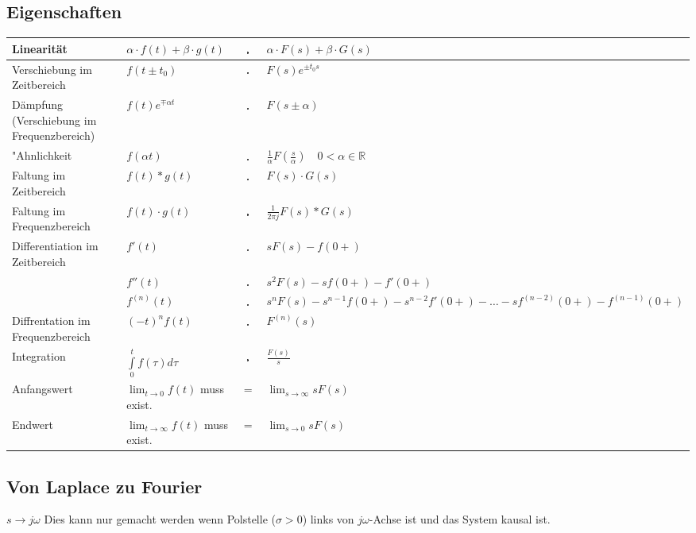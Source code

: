  	\subsection{Eigenschaften}
 	    \label{sec:Laplace Umwandulungen}
  		\renewcommand{\arraystretch}{2}
		\begin{tabular}{|l|l c p{5.5cm}|}
        	\hline
        	Linearität & 
 			$\alpha\cdot f(t) + \beta\cdot g(t)$ & $\FT$ & $\alpha\cdot F(s) +
 			\beta\cdot G(s)$ \\
 			\hline
 			Verschiebung im Zeitbereich &
 			$f(t\pm t_0) $ & $\FT$ & $ F(s)e^{\pm t_0 s}$ \\
 			\hline
 			Dämpfung (Verschiebung im Frequenzbereich) &
 			$f(t)e^{\mp\alpha t}$ & $\FT$ & $F(s\pm\alpha)$ \\
 			\hline
 			"Ahnlichkeit&
 			$f(\alpha t)$ & $\FT$ & $\frac{1}{\alpha}F \left (\frac{s}{\alpha} \right )
 			\quad 0 <\alpha \in\mathbb{R}$ \\
 			\hline
 			Faltung im Zeitbereich &
 			$f(t) \ast g(t)$ & $\FT$ &
 			$F(s) \cdot G(s)$\\
 			\hline 			
 			Faltung im Frequenzbereich &
 			$f(t) \cdot g(t)$ & $\FT$ & $\frac{1}{2 \pi j} F(s) \ast G(s)$ \\
 			\hline
 			Differentiation im Zeitbereich &
 			$f'(t)$ & $\FT$ & $sF(s) - f(0+)$ \\ 
 			&
 			$f''(t)$ & $\FT$ & $s^2 F(s) - sf(0+) - f'(0+)$\\ 
 			&
 			$f^{(n)}(t)$ & $\FT$ & $s^nF(s) - s^{n-1}f(0+) - s^{n-2} f'(0+) - \ldots
 			-s f^{(n-2)}(0+) - f^{(n-1)}(0+)$ \\
 			\hline
 			Diffrentation im Frequenzbereich &
 			$(-t)^n f(t)$ & $\FT$ & $F^{(n)}(s)$ \\
 			\hline
 			Integration &
 			$\int\limits_0^t f(\tau)d\tau$ & $\FT$ & $\frac{F(s)}{s}$ \\
 			\hline
 			Anfangswert &
 			$\lim_{t\rightarrow 0} f(t)$ muss exist. & $=$ & $\lim_{s\rightarrow
 			\infty} sF(s)$ \\
 			\hline
 			Endwert &
 			$\lim_{t\rightarrow \infty} f(t)$ muss exist. & $=$ & 
 			$\lim_{s\rightarrow 0} sF(s)$ \\
 			\hline
       	\end{tabular}
		\renewcommand{\arraystretch}{1}
		
		\subsection{Von Laplace zu Fourier}
			$s \rightarrow j\omega$ \hspace{0.5cm}
			Dies kann nur gemacht werden wenn Polstelle ($\sigma > 0$) links von
			$j\omega$-Achse ist und das System kausal ist.
			
